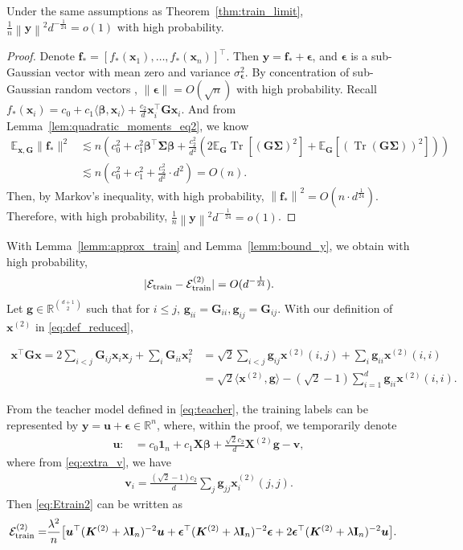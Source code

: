 \documentclass[twoside,11pt]{article}
\newcommand{\norm}[1]{\left\|#1\right\|}
\newcommand{\by}{\boldsymbol{y}}
\newcommand{\bepsilon}{\boldsymbol{\epsilon}}
\newcommand{\R}{\mathbb{R}}
\newcommand{\E}{\mathbb{E}}
\def\bI{{\mathbf I}}
\def\bG{{\boldsymbol G}}
\def\vf{{\boldsymbol f}}
\def\bK{{\boldsymbol K}}
\def\bX{{\boldsymbol X}}
\def\bg{{\boldsymbol g}}
\def\bu{{\boldsymbol u}}
\def\bv{{\boldsymbol v}}
\def\bx{{\boldsymbol x}}
\def\by{{\boldsymbol y}}
\def\bbeta{{\boldsymbol \beta}}
\def\bSigma{{\boldsymbol \Sigma}}
\def\cE{{\mathcal E}}
\renewcommand{\bK}{\boldsymbol{K}}
\newcommand{\Etrain}{\cE_{\textnormal{train}}}
\newcommand{\Tr}{\operatorname{Tr}}
\newcommand{\1}{\mathbf{1}}
\begin{document}
\begin{lemma}\label{lemm:bound_y} 
   Under the same assumptions as Theorem~\ref{thm:train_limit}, $\frac{1}{n}\norm{\by}^2 d^{-\frac{1}{24}}=o(1)$ with high probability.
\end{lemma}
\begin{proof}
Denote $\vf_*=[f_*(\bx_1),\ldots,f_*(\bx_n)]^\top$. Then
    $\by= \vf_* +\bepsilon$,
and $\bepsilon$ is a sub-Gaussian vector with mean zero and variance $\sigma_{\bepsilon}^2$.
By concentration of sub-Gaussian random vectors \citep{vershynin2018high}, $\|\bepsilon\|=O(\sqrt n)$ with high probability.  Recall $f_*(\bx_i)=c_0+c_1\langle \bbeta, \bx_i\rangle+\frac{c_2}{d}\bx_i^\top \bG \bx_i$.
And from Lemma~\ref{lem:quadratic_moments_eq2}, we know
\begin{align}
   \E_{\bx,\bG} \|\vf_*\|^2&\lesssim n(c_0^2  +c_1^2  \bbeta^\top\bSigma\bbeta +\frac{c_2^2}{d^2} (2\E_{\bG}\Tr[(\bG\bSigma)^2] +\E_{\bG}[(\Tr(\bG\bSigma))^2])) \\
   &\lesssim n(c_0^2+c_1^2 +\frac{c_2^2 }{d^2} \cdot d^2)=O(n).
\end{align}
Then, by Markov's inequality, with high probability, 
$\norm{\vf_* }^2 = O(n\cdot d^{\frac{1}{24}})$.
Therefore, with high probability,
$\frac{1}{n}\norm{\by}^2 d^{-\frac{1}{24}}=o(1)$. 
\end{proof}
With Lemma~\ref{lemm:approx_train} and Lemma~\ref{lemm:bound_y}, we obtain  with high probability,
\begin{align}\label{eq:Etrain_equivalence}
       |\Etrain -\Etrain^{(2)}|=O(d^{-\frac{1}{24}}).
\end{align}
Let $\bg\in \mathbb R^{\binom{d+1}{2}}$ such that for $i\leq j$, $\bg_{ii}=\bG_{ii}, \bg_{ij}=\bG_{ij}$.
 With our definition of $\bx^{(2)}$ in \eqref{eq:def_reduced},  
 
 \begin{align}
 \bx^\top\bG\bx=2\sum_{i<j} \bG_{ij}\bx_i\bx_j +\sum_{i}\bG_{ii}\bx_i^2 &=\sqrt{2}\sum_{i<j}\bg_{ij} \bx^{(2)}(i,j) + \sum_{i} \bg_{ii} \bx^{(2)}(i,i)\\
 &=\sqrt{2}\langle\bx^{(2)},\bg\rangle-(\sqrt{2}-1)\sum_{i=1}^d \bg_{ii} \bx^{(2)}(i,i).\label{eq:extra_v}
 \end{align}
 
From the teacher model defined in \eqref{eq:teacher}, the training labels can be represented by $\by = \bu+\bepsilon\in\R^n$,
where, within the proof, we temporarily denote
    \begin{align}\label{eq:defbv}
    \bu:&=c_0\1_n+c_1 \bX\bbeta+\frac{\sqrt{2} c_2}{d}\bX^{(2)}\bg-\bv,
    \end{align}
    where from \eqref{eq:extra_v}, we have
    \begin{align}
        \bv_i=\frac{(\sqrt 2-1)c_2}{d}\sum_{j}\bg_{jj} \bx_i^{(2)}(j,j).\label{eq:defv_i}
    \end{align}
Then \eqref{eq:Etrain2} can be written as
\begin{align}\label{eq:Etrain_2_decompose}
    \Etrain^{(2)}=&\frac{\lambda^2}{n}\big[\bu^\top (\bK^{(2)} +\lambda\bI_n)^{-2}\bu+\bepsilon^\top(\bK^{(2)} +\lambda\bI_n)^{-2}\bepsilon+2\bepsilon^\top(\bK^{(2)} +\lambda\bI_n)^{-2}\bu \big]. 
\end{align}
\end{document}
